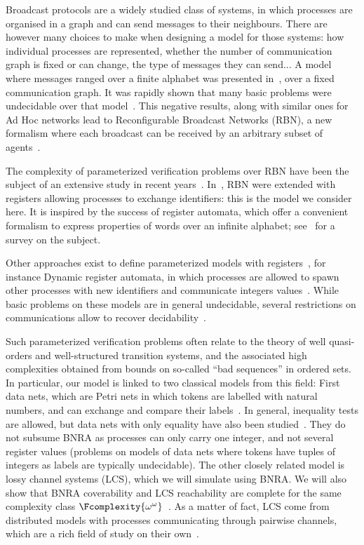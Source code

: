 Broadcast protocols are a widely studied class of systems, in which processes are organised in a graph and can send messages to their neighbours. There are however many choices to make when designing a model for those systems: how individual processes are represented, whether the number of communication graph is fixed or can change, the type of messages they can send... 
A model where messages ranged over a finite alphabet was presented in~\cite{emerson1998model}, over a fixed communication graph. It was rapidly shown that many basic problems were undecidable over that model~\cite{EsparzaFM1999verification}. This negative results, along with similar ones for Ad Hoc networks lead to Reconfigurable Broadcast Networks (RBN), a new formalism where each broadcast can be received by an arbitrary subset of agents~\cite{DelzannoSZ2010Adhoc}.

The complexity of parameterized verification problems over RBN have been the subject of an extensive study in recent years~\cite{Delzanno2012complexity, BalasubramanianBM2018parameterized, BalasubramanianGW2022parameterized, ChiniMS2019liveness}. In~\cite{DST2013}, RBN were extended with registers allowing processes to exchange identifiers: this is the model we consider here. It is inspired by the success of register automata, which offer a convenient formalism to express properties of words over an infinite alphabet; see~\cite{segoufin2006automata} for a survey on the subject.

Other approaches exist to define parameterized models with registers~\cite{BRS21}, for instance Dynamic register automata, in which processes are allowed to spawn other processes with new identifiers and communicate integers values~\cite{AbdullaAKR2014verification}. While basic problems on these models are in general undecidable, several restrictions on communications allow to recover decidability~\cite{AbdullaAKR2015verification, Rezine2017verification}.

Such parameterized verification problems often relate to the theory of well quasi-orders and well-structured transition systems, and the associated high complexities obtained from bounds on so-called ``bad sequences'' in ordered sets. In particular, our model is linked to two classical models from this field: First data nets, which are Petri nets in which tokens are labelled with natural numbers, and can exchange and compare their labels~\cite{lazic2007nets}. In general, inequality tests are allowed, but data nets with only equality have also been studied~\cite{ROSAVELARDO201741}. They do not subsume BNRA as processes can only carry one integer, and not several register values (problems on models of data nets where tokens have tuples of integers as labels are typically undecidable).
The other closely related model is lossy channel systems (LCS)\cite{AbdullaJ1996undec}, which we will simulate using BNRA. We will also show that BNRA coverability and LCS reachability are complete for the same complexity class $\Fcomplexity{\omega^\omega}$~\cite{ChambartS2008ordinal, Schnoebelen2002verifying}.
As a matter of fact, LCS come from distributed models with processes communicating through pairwise channels, which are a rich field of study on their own~\cite{Aiswarya2015model,Aiswarya2021network}.

